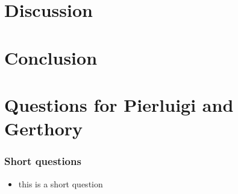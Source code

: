 \newpage
\chapter{Discussion}

\chapter{Conclusion}

\chapter{Questions for Pierluigi and Gerthory}

\subsection*{Short questions}
\begin{itemize} 
    \item this is a short question 
\end{itemize}
